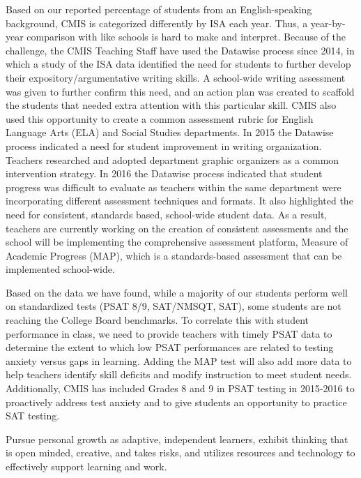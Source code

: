 Based on our reported percentage of students from an English-speaking background, CMIS is categorized differently by ISA each year. Thus, a year-by-year comparison with like schools is hard to make and interpret. Because of the challenge, the CMIS Teaching Staff have used the Datawise process since 2014, in which a study of the ISA data identified the need for students to further develop their expository/argumentative writing skills.  A school-wide writing assessment was given to further confirm this need, and an action plan was created to scaffold the students that needed extra attention with this particular skill. CMIS also used this opportunity to create a common assessment rubric for English Language Arts (ELA) and Social Studies departments. In 2015 the Datawise process indicated a need for student improvement in writing organization. Teachers researched and adopted department graphic organizers as a common intervention strategy. In 2016 the Datawise process indicated that student progress was difficult to evaluate as teachers within the same department were incorporating different assessment techniques and formats. It also highlighted the need for consistent, standards based, school-wide student data. As a result, teachers are currently working on the creation of consistent assessments and the school will be implementing the comprehensive assessment platform, Measure of Academic Progress (MAP), which is a standards-based assessment that can be implemented school-wide.

Based on the data we have found, while a majority of our students perform well on standardized tests (PSAT 8/9, SAT/NMSQT, SAT), some students are not reaching the College Board benchmarks. To correlate this with student performance in class, we need to provide teachers with timely PSAT data to determine the extent to which low PSAT performances are related to testing anxiety versus gaps in learning. Adding the MAP test will also add more data to help teachers identify skill deficits and modify instruction to meet student needs. Additionally, CMIS has included Grades 8 and 9 in PSAT testing in 2015-2016 to proactively address test anxiety and to give students an opportunity to practice SAT testing. 


Pursue personal growth as adaptive, independent learners, exhibit thinking that is open minded, creative, and takes risks, and utilizes resources and technology to effectively support learning and work.


